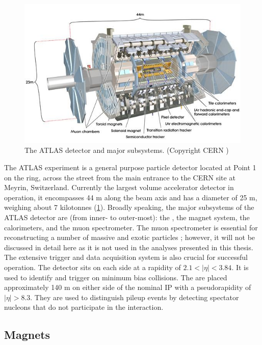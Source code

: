 \begin{figure}[t]
\includegraphics{ATLAS_layout.jpg}
\caption{The ATLAS detector and major subsystems. (Copyright CERN \cite{Pequenao:1095924})}
\label{fig:atlas_layout}
\end{figure}

The ATLAS experiment is a general purpose particle detector \cite{Aad:2008zzm} located at Point 1 on the \lhc ring, across the street from the main entrance to the CERN site at Meyrin, Switzerland.
Currently the largest volume accelerator detector in operation, it encompasses 44 m along the beam axis and has a diameter of 25 m, weighing about 7 kilotonnes (\cref{fig:atlas_layout}).
Broadly speaking, the major subsystems of the ATLAS detector are (from inner- to outer-most): the \id, the magnet system, the calorimeters, and the muon spectrometer.
The muon spectrometer is essential for reconstructing a number of massive and exotic particles \cite{ATLAS:1997ad}; however, it will not be discussed in detail here as it is not used in the analyses presented in this thesis.
The extensive trigger and data acquisition system is also crucial for successful operation.
The \mbts detector sits on each side at a rapidity of $2.1 < |\eta| < 3.84$.
It is used to identify and trigger on minimum bias collisions.
The \zdc are placed approximately 140 m on either side of the nominal \ac{IP} with a pseudorapidity of $|\eta| > 8.3$.
They are used to distinguish pileup events by detecting spectator nucleons that do not participate in the interaction.


\subsection{Magnets}
\label{subsec:atlas_magnet}


